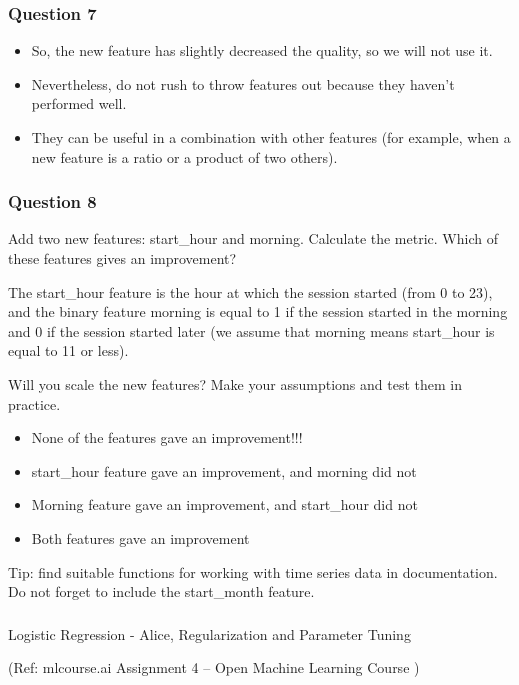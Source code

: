 \begin{frame}[fragile]\frametitle{Question 7}

\begin{itemize}
\item So, the new feature has slightly decreased the quality, so we will not use it. 
\item Nevertheless, do not rush to throw features out because they haven't performed well. 
\item They can be useful in a combination with other features (for example, when a new feature is a ratio or a product of two others).
\end{itemize}
\end{frame}

\begin{frame}[fragile]\frametitle{Question 8}

Add two new features: start\_hour and morning. Calculate the metric. Which of these features gives an improvement?

The start\_hour feature is the hour at which the session started (from 0 to 23), and the binary feature morning is equal to 1 if the session started in the morning and 0 if the session started later (we assume that morning means start\_hour is equal to 11 or less).

Will you scale the new features? Make your assumptions and test them in practice.

\begin{itemize}
\item None of the features gave an improvement!!!
\item start\_hour feature gave an improvement, and morning did not
\item Morning feature gave an improvement, and start\_hour did not
\item Both features gave an improvement
\end{itemize}

Tip: find suitable functions for working with time series data in documentation. Do not forget to include the start\_month feature.
\end{frame}

\begin{frame}[fragile]\frametitle{}
\begin{center}
{\Large Logistic Regression - Alice, Regularization and Parameter Tuning}

{\tiny (Ref: mlcourse.ai Assignment 4 – Open Machine Learning Course ) }
\end{center}
\end{frame}



